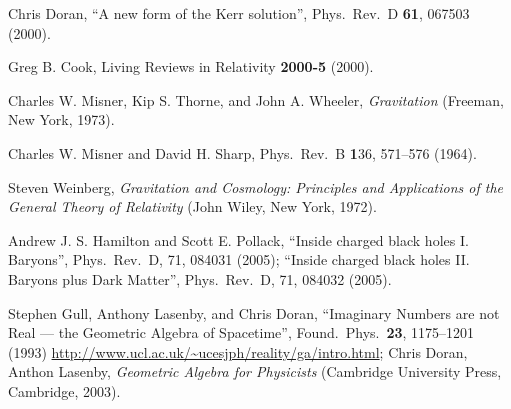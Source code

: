 \documentclass[twocolumn,showpacs,preprintnumbers,amsmath,amssymb,prb]{revtex4}
\begin{document}
\begin{thebibliography}{}
Chris Doran,
``A new form of the Kerr solution'',
Phys.\ Rev.\ D \textbf{61}, 067503 (2000).

Greg B. Cook,
Living Reviews in Relativity \textbf{2000-5} (2000).

Charles W. Misner, Kip S. Thorne, and John A. Wheeler,
{\sl Gravitation}
(Freeman, New York, 1973).

Charles W. Misner and David H. Sharp,
Phys.\ Rev.\ B {\textbf 136}, 571--576 (1964).

Steven Weinberg,
{\sl Gravitation and Cosmology:
Principles and Applications of the General Theory of Relativity}
(John Wiley, New York, 1972).





Andrew J. S. Hamilton and Scott E. Pollack,
``Inside charged black holes I.  Baryons'',
Phys.\ Rev.\ D, 71, 084031 (2005);
``Inside charged black holes II.  Baryons plus Dark Matter'',
Phys.\ Rev.\ D, 71, 084032 (2005).

Stephen Gull, Anthony Lasenby, and Chris Doran,
``Imaginary Numbers are not Real --- the Geometric Algebra of Spacetime'',
Found.\ Phys.\ \textbf{23}, 1175--1201 (1993)
\url{http://www.ucl.ac.uk/~ucesjph/reality/ga/intro.html};
Chris Doran, Anthon Lasenby,
{\sl Geometric Algebra for Physicists}
(Cambridge University Press, Cambridge, 2003).


\end{thebibliography}
\end{document}
